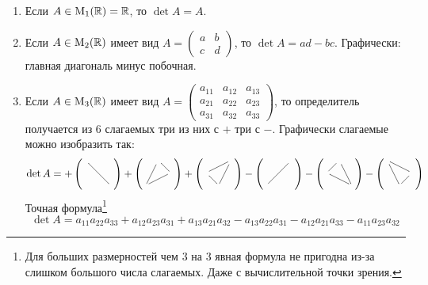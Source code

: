 \begin{enumerate}
\item Если $A\in \operatorname{M}_{1}(\mathbb R) = \mathbb R$, то $\det A = A$.
\item Если $A \in \operatorname{M}_{2}(\mathbb R)$ имеет вид $A = \left(\begin{smallmatrix}{a}&{b}\\{c}&{d}\end{smallmatrix}\right)$, то $\det A = ad - bc$. Графически: главная диагональ минус побочная.
\item Если $A\in \operatorname{M}_{3}(\mathbb R)$ имеет вид $A = \left(\begin{smallmatrix}{a_{11}}&{a_{12}}&{a_{13}}\\{a_{21}}&{a_{22}}&{a_{23}}\\{a_{31}}&{a_{32}}&{a_{33}}\end{smallmatrix}\right)$, то определитель получается из $6$ слагаемых три из них с $+$ три с $-$. Графически слагаемые можно изобразить так:
\[
\det A = 
+
\left(
\parbox{6pt}{
\xymatrix@R=6pt@C=6pt{
	{}\ar@{-}[ddrr]&{}&{}\\
	{}&{}&{}\\
	{}&{}&{}\\
}}
\right) +
\left(
\parbox{6pt}{
\xymatrix@R=6pt@C=6pt{
	{}&{}\ar@{-}[dr]&{}\\
	{}&{}&{}\ar@{-}[dll]\\
	{}\ar@{-}[uur]&{}&{}\\
}}
\right) +
\left(
\parbox{6pt}{
\xymatrix@R=6pt@C=6pt{
	{}&{}&{}\ar@{-}[ddl]\\
	{}\ar@{-}[urr]&{}&{}\\
	{}&{}\ar@{-}[ul]&{}\\
}}
\right) -
\left(
\parbox{6pt}{
\xymatrix@R=6pt@C=6pt{
	{}&{}&{}\ar@{-}[ddll]\\
	{}&{}&{}\\
	{}&{}&{}\\
}}
\right) -
\left(
\parbox{6pt}{
\xymatrix@R=6pt@C=6pt{
	{}&{}\ar@{-}[ddr]&{}\\
	{}\ar@{-}[ur]&{}&{}\\
	{}&{}&{}\ar@{-}[ull]\\
}}
\right) -
\left(
\parbox{6pt}{
\xymatrix@R=6pt@C=6pt{
	{}\ar@{-}[drr]&{}&{}\\
	{}&{}&{}\ar@{-}[dl]\\
	{}&{}\ar@{-}[uul]&{}\\
}}
\right) 
\]
Точная формула\footnote{Для больших размерностей чем $3$ на $3$ явная формула не пригодна из-за слишком большого числа слагаемых. Даже с вычислительной точки зрения.}
\[
\det A = a_{11}a_{22}a_{33} + a_{12}a_{23}a_{31} + a_{13}a_{21}a_{32} - 
a_{13}a_{22}a_{31} - a_{12}a_{21}a_{33} - a_{11}a_{23}a_{32}
\]
\end{enumerate}

